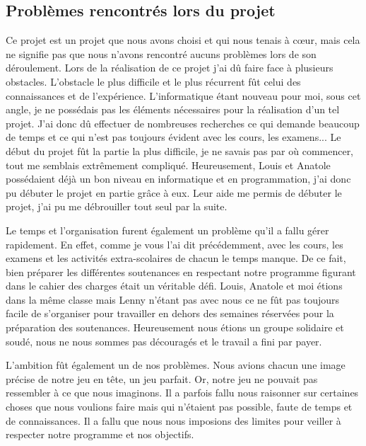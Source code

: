 \documentclass[12pt]{article}
\begin{document}
\subsection{Problèmes rencontrés lors du projet}
Ce projet est un projet que nous avons choisi et qui nous tenais à cœur, mais cela ne signifie pas que nous n’avons rencontré aucuns problèmes lors de son déroulement. Lors de la réalisation de ce projet j'ai dû faire face à plusieurs obstacles. L'obstacle le plus difficile et le plus récurrent fût celui des connaissances et de l'expérience. L'informatique étant nouveau pour moi, sous cet angle, je ne possédais pas les éléments nécessaires pour la réalisation d'un tel projet. J'ai donc dû effectuer de nombreuses recherches ce qui demande beaucoup de temps et ce qui n'est pas toujours évident avec les cours, les examens... Le début du projet fût la partie la plus difficile, je ne savais pas par où commencer, tout me semblais extrêmement compliqué. Heureusement, Louis et Anatole possédaient déjà un bon niveau en informatique et en programmation, j'ai donc pu débuter le projet en partie grâce à eux. Leur aide me permis de débuter le projet, j'ai pu me débrouiller tout seul par la suite.

Le temps et l'organisation furent également un problème qu'il a fallu gérer rapidement. En effet, comme je vous l'ai dit précédemment, avec les cours, les examens et les activités extra-scolaires de chacun le temps manque. De ce fait, bien préparer les différentes soutenances en respectant notre programme figurant dans le cahier des charges était un véritable défi. Louis, Anatole et moi étions dans la même classe mais Lenny n'étant pas avec nous ce ne fût pas toujours facile de s'organiser pour travailler en dehors des semaines réservées pour la préparation des soutenances. Heureusement nous étions un groupe solidaire et soudé, nous ne nous sommes pas découragés et le travail a fini par payer.

L'ambition fût également un de nos problèmes. Nous avions chacun une image précise de notre jeu en tête, un jeu parfait. Or, notre jeu ne pouvait pas ressembler à ce que nous imaginons. Il a parfois fallu nous raisonner sur certaines choses que nous voulions faire mais qui n'étaient pas possible, faute de temps et de connaissances. Il a fallu que nous nous imposions des limites pour veiller à respecter notre programme et nos objectifs.
\end{document}
